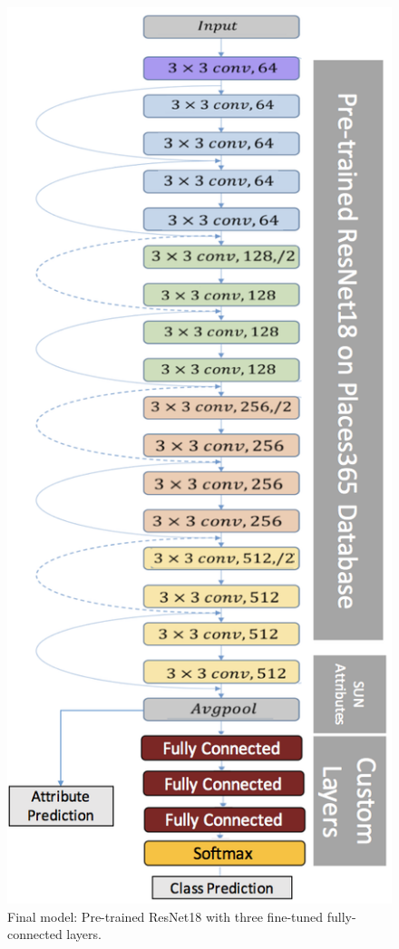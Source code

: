 \documentclass[10pt,twocolumn,letterpaper]{article}
\begin{document}
\begin{figure}[t]
\begin{center}
	\includegraphics[width=.75\linewidth]{model.png}
\end{center}
	\caption{Final model: Pre-trained ResNet18 with three fine-tuned fully-connected layers.}
\label{fig:model}
\end{figure}
\end{document}
